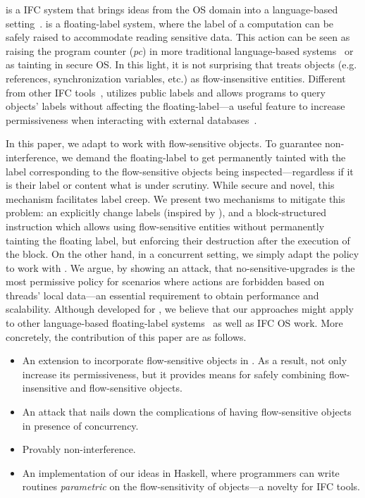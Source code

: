 {\LIO} is a IFC system that brings ideas from the OS domain into a language-based
setting~\citep{stefan:lio,stefan:addressing-covert}.  {\LIO} is a floating-label
system, where the label of a computation can be safely raised to accommodate
reading sensitive data. This action can be seen as raising the program counter
(\emph{pc}) in more traditional language-based
systems~\citep{sabelfeld:language-based-iflow} or as tainting in secure OS.  In
this light, it is not surprising that {\LIO} treats objects (e.g. references,
synchronization variables, etc.) as flow-insensitive entities. Different from
other IFC tools~\citep{jif,FlowCaml,Hedin13}, {\LIO} utilizes public labels and
allows programs to query objects' labels without affecting the
floating-label---a useful feature to increase permissiveness when interacting
with external databases~\citep{giffin:hails}.

In this paper, we adapt {\LIO} to work with flow-sensitive objects. To guarantee
non-interference, we demand the floating-label to get permanently tainted with
the label corresponding to the flow-sensitive objects being
inspected---regardless if it is their label or content what is under
scrutiny. While secure and novel, this mechanism facilitates label creep. We
present two mechanisms to mitigate this problem: an explicitly change labels
(inspired by \citep{Hedin13}), and a block-structured instruction which allows
using flow-sensitive entities without permanently tainting the floating label,
but enforcing their destruction after the execution of the block.  On the other
hand, in a concurrent setting, we simply adapt the {\nsu} policy to work with
\LIO. We argue, by showing an attack, that no-sensitive-upgrades is the most
permissive policy for scenarios where actions are forbidden based on threads'
local data---an essential requirement to obtain performance and
scalability. Although developed for {\LIO}, we believe that our approaches might
apply to other language-based floating-label
systems~\citep[e.g.][]{10.1109/SP.2013.10} as well as IFC OS work.  More
concretely, the contribution of this paper are as follows.
\begin{itemize}

\item An extension to incorporate flow-sensitive objects in {\LIO}. As a result,
  not only increase {\LIO} its permissiveness, but it provides means for safely
  combining flow-insensitive and flow-sensitive objects.


\item An attack that nails down the complications of having flow-sensitive
  objects in presence of concurrency.

\item Provably non-interference. 

\item An implementation of our ideas in Haskell, where programmers can write
  routines \emph{parametric} on the flow-sensitivity of objects---a novelty for IFC
  tools. 
\end{itemize}

